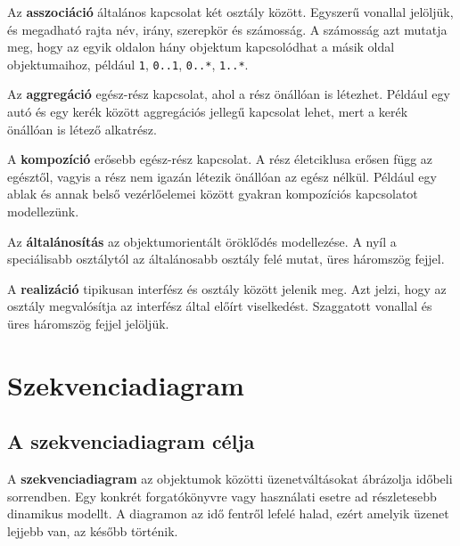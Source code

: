 \begin{center}

\end{center}

Az \textbf{asszociáció} általános kapcsolat két osztály között. Egyszerű vonallal jelöljük, és megadható rajta név, irány, szerepkör és számosság. A számosság azt mutatja meg, hogy az egyik oldalon hány objektum kapcsolódhat a másik oldal objektumaihoz, például \texttt{1}, \texttt{0..1}, \texttt{0..*}, \texttt{1..*}.

Az \textbf{aggregáció} egész-rész kapcsolat, ahol a rész önállóan is létezhet. Például egy autó és egy kerék között aggregációs jellegű kapcsolat lehet, mert a kerék önállóan is létező alkatrész.

A \textbf{kompozíció} erősebb egész-rész kapcsolat. A rész életciklusa erősen függ az egésztől, vagyis a rész nem igazán létezik önállóan az egész nélkül. Például egy ablak és annak belső vezérlőelemei között gyakran kompozíciós kapcsolatot modellezünk.

Az \textbf{általánosítás} az objektumorientált öröklődés modellezése. A nyíl a speciálisabb osztálytól az általánosabb osztály felé mutat, üres háromszög fejjel.

A \textbf{realizáció} tipikusan interfész és osztály között jelenik meg. Azt jelzi, hogy az osztály megvalósítja az interfész által előírt viselkedést. Szaggatott vonallal és üres háromszög fejjel jelöljük.

\section{Szekvenciadiagram}

\subsection{A szekvenciadiagram célja}

A \textbf{szekvenciadiagram} az objektumok közötti üzenetváltásokat ábrázolja időbeli sorrendben. Egy konkrét forgatókönyvre vagy használati esetre ad részletesebb dinamikus modellt. A diagramon az idő fentről lefelé halad, ezért amelyik üzenet lejjebb van, az később történik.

\begin{center}

\end{center}




